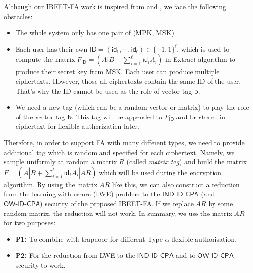 \documentclass[runningheads,10pt]{llncs}
\def\bf{\mathbf}
\def\OW{\textsf{OW-ID-CPA}}
\def\IND{\textsf{IND-ID-CPA}}
\def\b{\bf{b}}
\def\ID{\mathsf{ID}}
\def\id{\mathsf{id}}
\begin{document}
Although our IBEET-FA work is inspired from \cite{PKEET-FA-Duong20} and \cite{ABB10-EuroCrypt}, we face the following obstacles:
\begin{itemize}
	\item The whole system only has one pair of (MPK, MSK).
	\item Each user has their own $\ID=(\id_1,\cdots,\id_\ell)\in\{-1,1\}^\ell$, which is used to compute the matrix $F_\ID=(A|B + \sum_{i=1}^\ell\id_iA_i)$ in \textsf{Extract} algorithm to produce their secret key from MSK. Each user can produce multiple ciphertexts. However, those all ciphertexts contain the same \textsf{ID} of the user. That's why the \textsf{ID} cannot be used as the role of vector tag $\b$. 
	\item We need a new tag (which can be a random vector or matrix) to play the role of the vector tag $\b$. This tag will be appended to $F_\ID$ and be stored in ciphertext for flexible authorization later.
\end{itemize}


Therefore, in order  to support FA with many different types, we need to provide additional tag which is random and specified for each ciphertext. Namely, we sample uniformly at random a matrix $R$ (called  \textit{matrix tag}) and build the matrix $F=(A|B + \sum_{i=1}^\ell\id_iA_i|AR)$ which will be used during  the encryption algorithm. By using the matrix $AR$ like this, we can also construct a reduction from the learning with errors (LWE) problem to the $\IND$ (and $\OW$) security of the proposed IBEET-FA. If we replace $AR$ by some random matrix, the reduction will not work. In summary, we use the matrix $AR$ for two purposes:
\begin{itemize}
	\item \textbf{P1:} To combine with trapdoor for different Type-$\alpha$ flexible authorisation.
	\item \textbf{P2:} For the reduction from LWE to the $\IND$ and to $\OW$ security to work.
\end{itemize}
\end{document}
